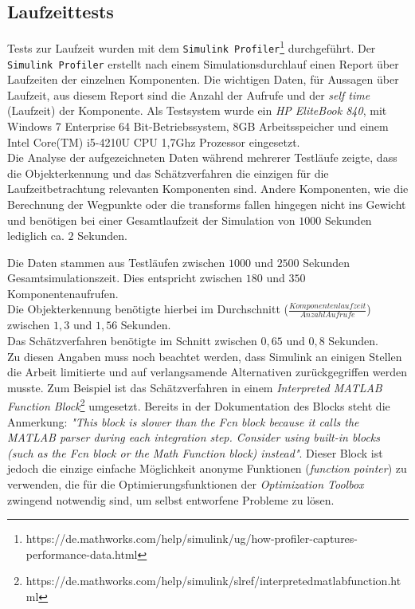 \subsection{Laufzeittests}
\label{sec_laufzeit}
Tests zur Laufzeit wurden mit dem \texttt{Simulink Profiler}\footnote{https://de.mathworks.com/help/simulink/ug/how-profiler-captures-performance-data.html} durchgeführt. Der \texttt{Simulink Profiler} erstellt nach einem Simulationsdurchlauf einen Report über Laufzeiten der einzelnen Komponenten. Die wichtigen Daten, für Aussagen über Laufzeit, aus diesem Report sind die Anzahl der Aufrufe und der \textit{self time} (Laufzeit) der Komponente. Als Testsystem wurde ein \textit{HP EliteBook 840}, mit Windows 7 Enterprise 64 Bit-Betriebssystem, $8$GB Arbeitsspeicher und einem Intel Core(TM) i5-4210U CPU 1,7Ghz Prozessor eingesetzt. \\
Die Analyse der aufgezeichneten Daten während mehrerer Testläufe zeigte, dass die Objekterkennung und das Schätzverfahren die einzigen für die Laufzeitbetrachtung relevanten Komponenten sind. Andere Komponenten, wie die Berechnung der Wegpunkte oder die \glspl{transform} fallen hingegen nicht ins Gewicht und benötigen bei einer Gesamtlaufzeit der Simulation von $1000$ Sekunden lediglich ca. $2$ Sekunden. 

Die Daten stammen aus Testläufen zwischen $1000$ und $2500$ Sekunden Gesamtsimulationszeit. Dies entspricht zwischen $180$ und $350$ Komponentenaufrufen.\\
Die Objekterkennung benötigte hierbei im Durchschnitt ($\frac{Komponentenlaufzeit}{Anzahl Aufrufe}$) zwischen $1,3$ und $1,56$ Sekunden.\\
Das Schätzverfahren benötigte im Schnitt zwischen $0,65$ und $0,8$ Sekunden.\\

Zu diesen Angaben muss noch beachtet werden, dass Simulink an einigen Stellen die Arbeit limitierte und auf verlangsamende Alternativen zurückgegriffen werden musste. Zum Beispiel ist das Schätzverfahren in einem \textit{Interpreted MATLAB Function Block}\footnote{https://de.mathworks.com/help/simulink/slref/interpretedmatlabfunction.html} umgesetzt. Bereits in der Dokumentation des Blocks steht die Anmerkung: \textit{"This block is slower than the Fcn block because it calls the MATLAB parser during each integration step. Consider using built-in blocks (such as the Fcn block or the Math Function block) instead"}. Dieser Block ist jedoch die einzige einfache Möglichkeit anonyme Funktionen (\textit{function pointer}) zu verwenden, die für die Optimierungsfunktionen der \textit{Optimization Toolbox} zwingend notwendig sind, um selbst entworfene Probleme zu lösen.

%
